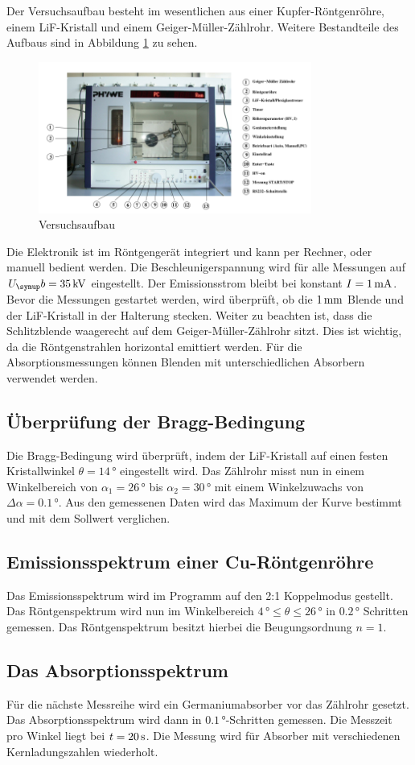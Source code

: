 Der Versuchsaufbau besteht im wesentlichen aus einer Kupfer-Röntgenröhre,
einem LiF-Kristall und einem Geiger-Müller-Zählrohr. Weitere Bestandteile des
Aufbaus sind in Abbildung \ref{fig:aufbau} zu sehen.
\begin{figure}[H]
  \centering
  \includegraphics[width=0.8\textwidth]{bilder/aufbau.pdf}
  \caption{Versuchsaufbau\cite{V602}}
  \label{fig:aufbau}
\end{figure}
Die Elektronik ist im Röntgengerät integriert und kann per Rechner, oder
manuell bedient werden. Die Beschleunigerspannung wird für alle Messungen auf
$U_\su{b}=35\kVolt$ eingestellt. Der Emissionsstrom bleibt bei konstant
$I=1\,\si{\milli\ampere}$. Bevor die Messungen gestartet werden, wird überprüft, ob die $1\,\si{\milli\meter}$
Blende und der LiF-Kristall in der Halterung stecken. Weiter zu beachten ist,
dass die Schlitzblende waagerecht auf dem Geiger-Müller-Zählrohr sitzt. Dies
ist wichtig, da die Röntgenstrahlen horizontal emittiert werden.
Für die Absorptionsmessungen können Blenden mit unterschiedlichen Absorbern
verwendet werden.
\subsection{Überprüfung der Bragg-Bedingung}
Die Bragg-Bedingung wird überprüft, indem der LiF-Kristall auf einen festen
Kristallwinkel $\theta=14\,\si{\degree}$ eingestellt wird. Das Zählrohr misst nun in einem
Winkelbereich von $\alpha_1=26\,\si{\degree}$ bis $\alpha_2=30\,\si{\degree}$ mit einem Winkelzuwachs
von $\Delta\alpha=0.1\,\si{\degree}$. Aus den gemessenen Daten wird das Maximum der Kurve
bestimmt und mit dem Sollwert verglichen.
\subsection{Emissionsspektrum einer Cu-Röntgenröhre}
Das Emissionsspektrum wird im Programm auf den 2:1 Koppelmodus gestellt. Das
Röntgenspektrum wird nun im Winkelbereich $4\,\si{\degree}\leq\theta\leq 26\,\si{\degree}$ in $0.2\,\si{\degree}$
Schritten gemessen. Das Röntgenspektrum besitzt hierbei die Beugungsordnung
$n=1$.
\subsection{Das Absorptionsspektrum}
Für die nächste Messreihe wird ein Germaniumabsorber vor das Zählrohr gesetzt.
Das Absorptionsspektrum wird dann in $0.1\,\si{\degree}$-Schritten gemessen. Die Messzeit pro
Winkel liegt bei $t=20\,\si{\second}$. Die Messung wird für Absorber mit verschiedenen
Kernladungszahlen wiederholt.
